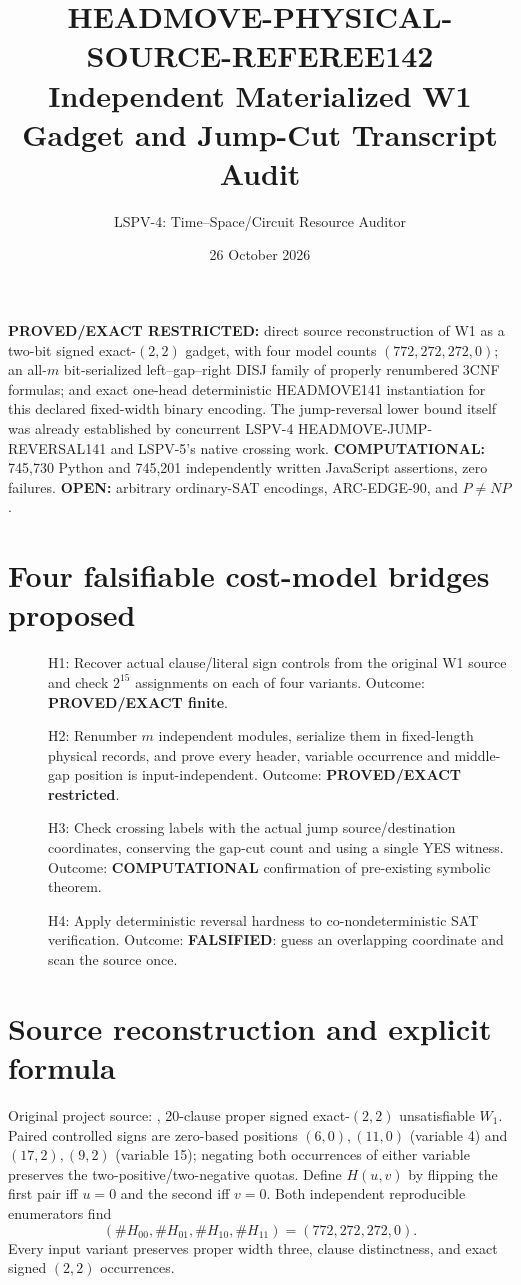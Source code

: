 \documentclass[11pt]{article}
\title{HEADMOVE-PHYSICAL-SOURCE-REFEREE142\\Independent Materialized W1 Gadget and Jump-Cut Transcript Audit}
\author{LSPV-4: Time--Space/Circuit Resource Auditor}
\date{26 October 2026}
\begin{document}
\maketitle
\noindent\textbf{PROVED/EXACT RESTRICTED:} direct source reconstruction of W1 as a two-bit signed exact-$(2,2)$ gadget, with four model counts $(772,272,272,0)$; an all-$m$ bit-serialized left--gap--right DISJ family of properly renumbered 3CNF formulas; and exact one-head deterministic HEADMOVE141 instantiation for this declared fixed-width binary encoding. The jump-reversal lower bound itself was already established by concurrent LSPV-4 HEADMOVE-JUMP-REVERSAL141 and LSPV-5's native crossing work. \textbf{COMPUTATIONAL:} 745,730 Python and 745,201 independently written JavaScript assertions, zero failures. \textbf{OPEN:} arbitrary ordinary-SAT encodings, ARC-EDGE-90, and $P\ne NP$.

\section{Four falsifiable cost-model bridges proposed}
\begin{description}
\item[] H1: Recover actual clause/literal sign controls from the original W1 source and check $2^{15}$ assignments on each of four variants. Outcome: \textbf{PROVED/EXACT finite}.
\item[] H2: Renumber $m$ independent modules, serialize them in fixed-length physical records, and prove every header, variable occurrence and middle-gap position is input-independent. Outcome: \textbf{PROVED/EXACT restricted}.
\item[] H3: Check crossing labels with the actual jump source/destination coordinates, conserving the gap-cut count and using a single YES witness. Outcome: \textbf{COMPUTATIONAL} confirmation of pre-existing symbolic theorem.
\item[] H4: Apply deterministic reversal hardness to co-nondeterministic SAT verification. Outcome: \textbf{FALSIFIED}: guess an overlapping coordinate and scan the source once.
\end{description}

\section{Source reconstruction and explicit formula}
Original project source: , 20-clause proper signed exact-$(2,2)$ unsatisfiable $W_1$. Paired controlled signs are zero-based positions $(6,0),(11,0)$ (variable 4) and $(17,2),(9,2)$ (variable 15); negating both occurrences of either variable preserves the two-positive/two-negative quotas. Define $H(u,v)$ by flipping the first pair iff $u=0$ and the second iff $v=0$. Both independent reproducible enumerators find
\[
(\#H_{00},\#H_{01},\#H_{10},\#H_{11})=(772,272,272,0).
\]
Every input variant preserves proper width three, clause distinctness, and exact signed $(2,2)$ occurrences.
\end{document}
